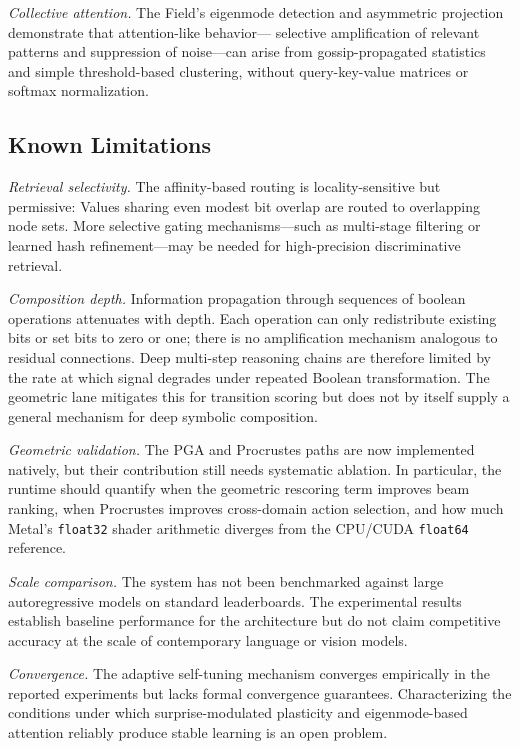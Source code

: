 \emph{Collective attention.}  The Field's eigenmode detection and
asymmetric projection demonstrate that attention-like behavior---
selective amplification of relevant patterns and suppression of
noise---can arise from gossip-propagated statistics and simple
threshold-based clustering, without query-key-value matrices or
softmax normalization.

\subsection{Known Limitations}
\label{sec:limitations}

\emph{Retrieval selectivity.}  The affinity-based routing is
locality-sensitive but permissive: Values sharing even modest bit
overlap are routed to overlapping node sets.  More selective gating
mechanisms---such as multi-stage filtering or learned hash
refinement---may be needed for high-precision discriminative retrieval.

\emph{Composition depth.}  Information propagation through sequences of
boolean operations attenuates with depth.  Each operation can only
redistribute existing bits or set bits to zero or one; there is no
amplification mechanism analogous to residual connections.  Deep
multi-step reasoning chains are therefore limited by the rate at which
signal degrades under repeated Boolean transformation.  The geometric
lane mitigates this for transition scoring but does not by itself supply
a general mechanism for deep symbolic composition.

\emph{Geometric validation.}  The PGA and Procrustes paths are now
implemented natively, but their contribution still needs systematic
ablation.  In particular, the runtime should quantify when the geometric
rescoring term improves beam ranking, when Procrustes improves
cross-domain action selection, and how much Metal's \texttt{float32}
shader arithmetic diverges from the CPU/CUDA \texttt{float64} reference.

\emph{Scale comparison.}  The system has not been benchmarked against
large autoregressive models on standard leaderboards.  The experimental
results establish baseline performance for the architecture but do not
claim competitive accuracy at the scale of contemporary language or
vision models.

\emph{Convergence.}  The adaptive self-tuning mechanism converges
empirically in the reported experiments but lacks formal convergence
guarantees.  Characterizing the conditions under which
surprise-modulated plasticity and eigenmode-based attention reliably
produce stable learning is an open problem.


